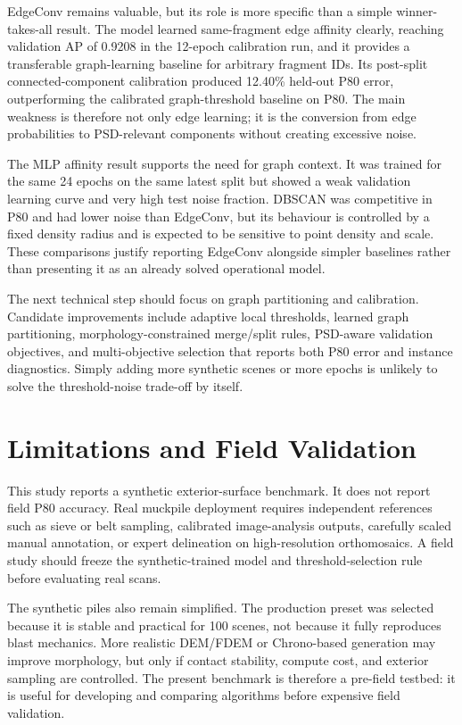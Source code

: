\documentclass[11pt]{article}
\begin{document}
EdgeConv remains valuable, but its role is more specific than a simple winner-takes-all result. The model learned same-fragment edge affinity clearly, reaching validation AP of 0.9208 in the 12-epoch calibration run, and it provides a transferable graph-learning baseline for arbitrary fragment IDs. Its post-split connected-component calibration produced 12.40\% held-out P80 error, outperforming the calibrated graph-threshold baseline on P80. The main weakness is therefore not only edge learning; it is the conversion from edge probabilities to PSD-relevant components without creating excessive noise.

The MLP affinity result supports the need for graph context. It was trained for the same 24 epochs on the same latest split but showed a weak validation learning curve and very high test noise fraction. DBSCAN was competitive in P80 and had lower noise than EdgeConv, but its behaviour is controlled by a fixed density radius and is expected to be sensitive to point density and scale. These comparisons justify reporting EdgeConv alongside simpler baselines rather than presenting it as an already solved operational model.

The next technical step should focus on graph partitioning and calibration. Candidate improvements include adaptive local thresholds, learned graph partitioning, morphology-constrained merge/split rules, PSD-aware validation objectives, and multi-objective selection that reports both P80 error and instance diagnostics. Simply adding more synthetic scenes or more epochs is unlikely to solve the threshold-noise trade-off by itself.

\section{Limitations and Field Validation}
This study reports a synthetic exterior-surface benchmark. It does not report field P80 accuracy. Real muckpile deployment requires independent references such as sieve or belt sampling, calibrated image-analysis outputs, carefully scaled manual annotation, or expert delineation on high-resolution orthomosaics. A field study should freeze the synthetic-trained model and threshold-selection rule before evaluating real scans.

The synthetic piles also remain simplified. The production preset was selected because it is stable and practical for 100 scenes, not because it fully reproduces blast mechanics. More realistic DEM/FDEM or Chrono-based generation may improve morphology, but only if contact stability, compute cost, and exterior sampling are controlled. The present benchmark is therefore a pre-field testbed: it is useful for developing and comparing algorithms before expensive field validation.
\end{document}
